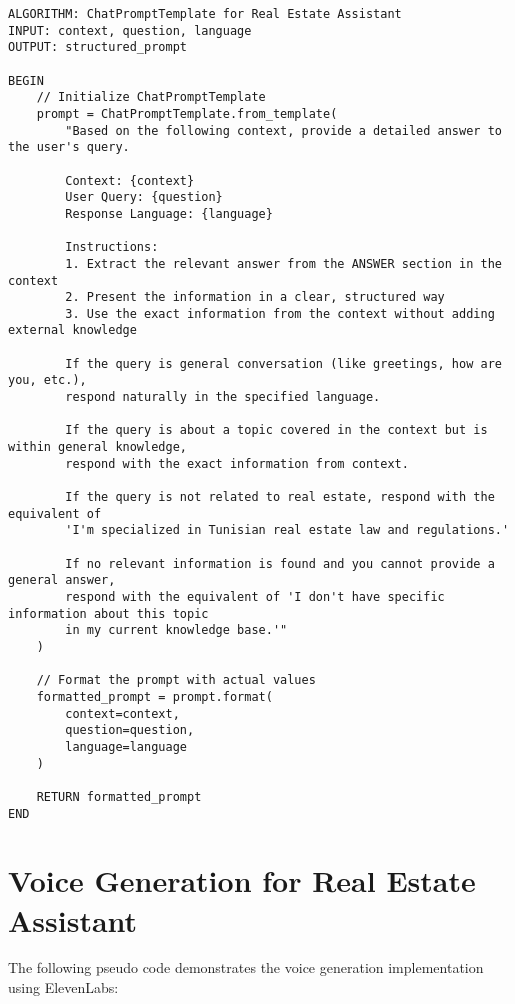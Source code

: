 \begin{verbatim}
ALGORITHM: ChatPromptTemplate for Real Estate Assistant
INPUT: context, question, language
OUTPUT: structured_prompt

BEGIN
    // Initialize ChatPromptTemplate
    prompt = ChatPromptTemplate.from_template(
        "Based on the following context, provide a detailed answer to the user's query.
        
        Context: {context}
        User Query: {question}
        Response Language: {language}
        
        Instructions:
        1. Extract the relevant answer from the ANSWER section in the context
        2. Present the information in a clear, structured way
        3. Use the exact information from the context without adding external knowledge
        
        If the query is general conversation (like greetings, how are you, etc.), 
        respond naturally in the specified language.
        
        If the query is about a topic covered in the context but is within general knowledge, 
        respond with the exact information from context.
        
        If the query is not related to real estate, respond with the equivalent of 
        'I'm specialized in Tunisian real estate law and regulations.'
        
        If no relevant information is found and you cannot provide a general answer, 
        respond with the equivalent of 'I don't have specific information about this topic 
        in my current knowledge base.'"
    )
    
    // Format the prompt with actual values
    formatted_prompt = prompt.format(
        context=context,
        question=question,
        language=language
    )
    
    RETURN formatted_prompt
END
\end{verbatim}

\section{Voice Generation for Real Estate Assistant}
\label{app:B}

The following pseudo code demonstrates the voice generation implementation using ElevenLabs:

